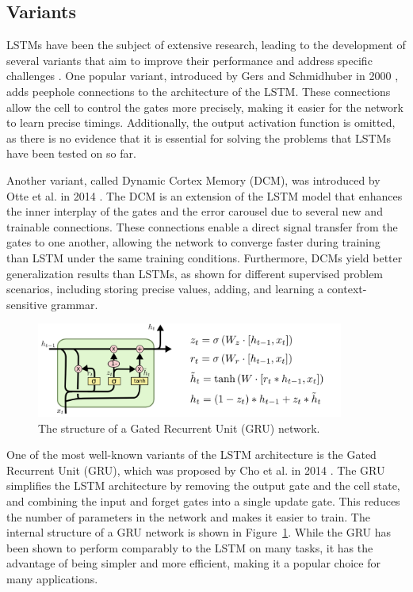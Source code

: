 \documentclass{article}
\newcommand{\reffig}[1]{Figure~\ref{#1}}
\begin{document}
\subsection{Variants}
\label{sec:3.1}

LSTMs have been the subject of extensive research, leading to the development of several
variants that aim to improve their performance and address specific challenges
\cite{greffLSTMSearchSpace2017}. One popular variant, introduced by Gers and Schmidhuber
in 2000 \cite{gersRecurrentNetsTime2000}, adds peephole connections to the architecture
of the LSTM. These connections allow the cell to control the gates more precisely, making
it easier for the network to learn precise timings. Additionally, the output activation
function is omitted, as there is no evidence that it is essential for solving the problems
that LSTMs have been tested on so far.

Another variant, called Dynamic Cortex Memory (DCM), was introduced by Otte et al. in 2014
\cite{otte2014dynamic}. The DCM is an extension of the LSTM model that enhances the inner
interplay of the gates and the error carousel due to several new and trainable
connections. These connections enable a direct signal transfer from the gates to one
another, allowing the network to converge faster during training than LSTM under the same
training conditions. Furthermore, DCMs yield better generalization results than LSTMs, as
shown for different supervised problem scenarios, including storing precise values,
adding, and learning a context-sensitive grammar.


\begin{figure}[htbp]
  \centering
  \includegraphics[width=0.9\textwidth]{LSTM3-var-GRU.png}
  \caption{The structure of a Gated Recurrent Unit (GRU) network. \cite{olahUnderstandingLSTM}}
  \label{fig:gru}
\end{figure}
One of the most well-known variants of the LSTM architecture is the Gated Recurrent Unit
(GRU), which was proposed by Cho et al. in 2014
\cite{choLearningPhraseRepresentations2014}. The GRU simplifies the LSTM architecture by
removing the output gate and the cell state, and combining the input and forget gates into
a single update gate. This reduces the number of parameters in the network and makes it
easier to train. The internal structure of a GRU network is shown in \reffig{fig:gru}.
While the GRU has been shown to perform comparably to the LSTM on many tasks, it has the
advantage of being simpler and more efficient, making it a popular choice for many
applications.
\end{document}
